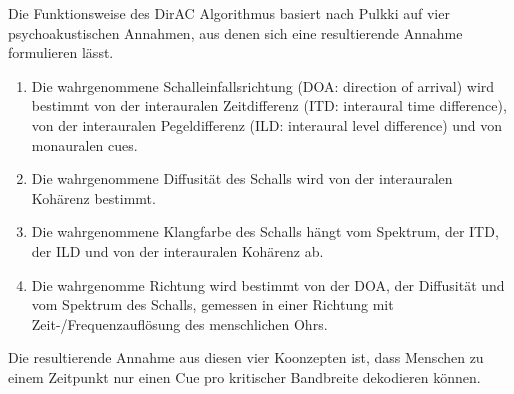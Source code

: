 Die Funktionsweise des DirAC Algorithmus basiert nach Pulkki \cite{pulkki} auf vier psychoakustischen Annahmen, aus denen sich eine resultierende Annahme formulieren lässt.

\begin{enumerate}
    \item Die wahrgenommene Schalleinfallsrichtung (DOA: direction of arrival) wird bestimmt von der interauralen Zeitdifferenz (ITD: interaural time difference), von der interauralen Pegeldifferenz (ILD: interaural level difference) und von monauralen cues.
    \item Die wahrgenommene Diffusität des Schalls wird von der interauralen Kohärenz bestimmt.
    \item Die wahrgenommene Klangfarbe des Schalls hängt vom Spektrum, der ITD, der ILD und von der interauralen Kohärenz ab.
    \item Die wahrgenomme Richtung wird bestimmt von der DOA, der Diffusität und vom Spektrum des Schalls, gemessen in einer Richtung mit Zeit-/Frequenzauflösung des menschlichen Ohrs.
\end{enumerate}

Die resultierende Annahme aus diesen vier Koonzepten ist, dass Menschen zu einem Zeitpunkt nur einen Cue pro kritischer Bandbreite dekodieren können.